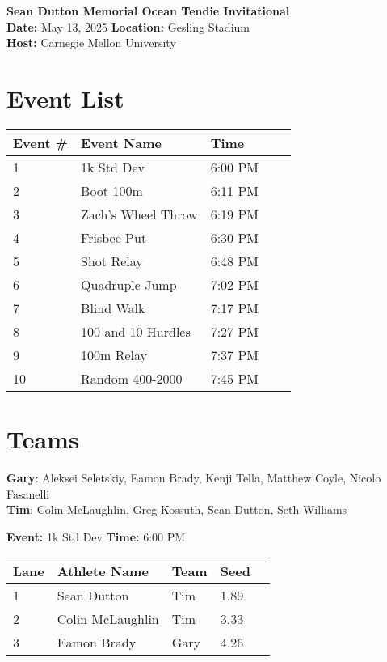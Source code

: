 \documentclass[10pt]{article}
\begin{document}
\begin{center}
    \LARGE \textbf{Sean Dutton Memorial Ocean Tendie Invitational} \\
    \large
    \vspace{0.5em}
    \textbf{Date:} May 13, 2025 \hspace{2cm} \textbf{Location:} Gesling Stadium \\
    \textbf{Host:} Carnegie Mellon University
\end{center}

\vspace{1em}

\section*{Event List}

\begin{tabular}{@{}lllll@{}}
\toprule
\textbf{Event \#} & \textbf{Event Name} &  \textbf{Time} \\
\midrule
1 & 1k Std Dev & 6:00 PM \\
2 & Boot 100m & 6:11 PM \\
3 & Zach's Wheel Throw & 6:19 PM \\
4 & Frisbee Put & 6:30 PM \\
5 & Shot Relay & 6:48 PM \\
6 & Quadruple Jump & 7:02 PM \\
7 & Blind Walk & 7:17 PM \\
8 & 100 and 10 Hurdles & 7:27 PM \\
9 & 100m Relay & 7:37 PM \\
10 & Random 400-2000 & 7:45 PM \\
\bottomrule
\end{tabular}


\vspace{2em}
\section*{Teams}

\textbf{Gary}: Aleksei Seletskiy, Eamon Brady, Kenji Tella, Matthew Coyle, Nicolo Fasanelli
\\\textbf{Tim}: Colin McLaughlin, Greg Kossuth, Sean Dutton, Seth Williams

\twocolumn


\textbf{Event:} 1k Std Dev \quad \textbf{Time:} 6:00 PM 

\vspace{1em}
\begin{tabular}{@{}lllll@{}}
\toprule

\textbf{Lane} & \textbf{Athlete Name} & \textbf{Team} & \textbf{Seed} \\
\midrule
1 & Sean Dutton & Tim & 1.89 &\\
2 & Colin McLaughlin & Tim & 3.33 &\\
3 & Eamon Brady & Gary & 4.26 &\\
\bottomrule
\end{tabular}
\vspace{2.5em}
\end{document}
